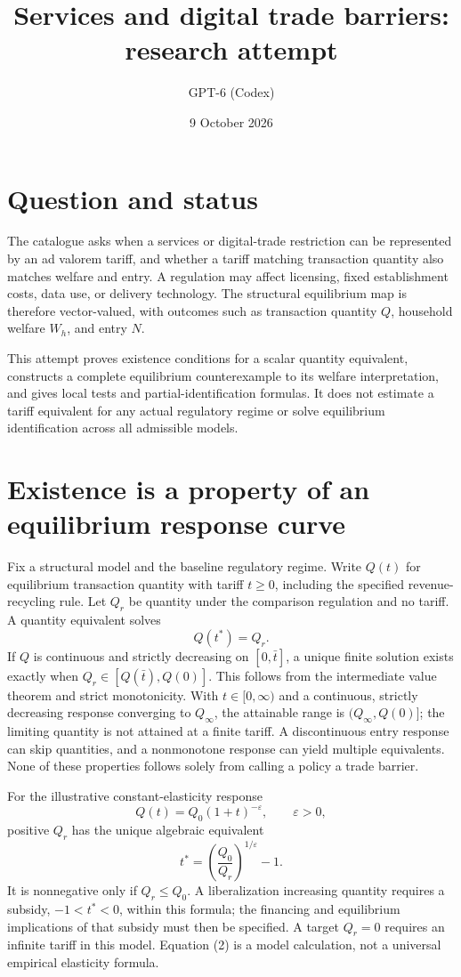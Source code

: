 \documentclass[11pt]{article}
\title{Services and digital trade barriers: research attempt}
\author{GPT-6 (Codex)}
\date{9 October 2026}
\begin{document}
\maketitle

\section*{Question and status}
The catalogue asks when a services or digital-trade restriction can be represented by an ad valorem tariff, and whether a tariff matching transaction quantity also matches welfare and entry. A regulation may affect licensing, fixed establishment costs, data use, or delivery technology. The structural equilibrium map is therefore vector-valued, with outcomes such as transaction quantity $Q$, household welfare $W_h$, and entry $N$.

This attempt proves existence conditions for a scalar quantity equivalent, constructs a complete equilibrium counterexample to its welfare interpretation, and gives local tests and partial-identification formulas. It does not estimate a tariff equivalent for any actual regulatory regime or solve equilibrium identification across all admissible models.

\section*{Existence is a property of an equilibrium response curve}
Fix a structural model and the baseline regulatory regime. Write $Q(t)$ for equilibrium transaction quantity with tariff $t\geq0$, including the specified revenue-recycling rule. Let $Q_r$ be quantity under the comparison regulation and no tariff. A quantity equivalent solves
\[
 Q(t^*)=Q_r.                                                   \tag{1}
\]
If $Q$ is continuous and strictly decreasing on $[0,\bar t]$, a unique finite solution exists exactly when $Q_r\in[Q(\bar t),Q(0)]$. This follows from the intermediate value theorem and strict monotonicity. With $t\in[0,\infty)$ and a continuous, strictly decreasing response converging to $Q_\infty$, the attainable range is $(Q_\infty,Q(0)]$; the limiting quantity is not attained at a finite tariff. A discontinuous entry response can skip quantities, and a nonmonotone response can yield multiple equivalents. None of these properties follows solely from calling a policy a trade barrier.

For the illustrative constant-elasticity response
\[
 Q(t)=Q_0(1+t)^{-\varepsilon},\qquad \varepsilon>0,
\]
positive $Q_r$ has the unique algebraic equivalent
\[
 t^*=\left(\frac{Q_0}{Q_r}\right)^{1/\varepsilon}-1.           \tag{2}
\]
It is nonnegative only if $Q_r\leq Q_0$. A liberalization increasing quantity requires a subsidy, $-1<t^*<0$, within this formula; the financing and equilibrium implications of that subsidy must then be specified. A target $Q_r=0$ requires an infinite tariff in this model. Equation (2) is a model calculation, not a universal empirical elasticity formula.
\end{document}
